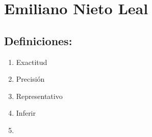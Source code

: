 \section{Emiliano Nieto Leal}
\subsection{Definiciones:}

\begin{enumerate}
    \item Exactitud
    \item Precisión
    \item Representativo
    \item Inferir
    \item 
\end{enumerate}

\newpage

